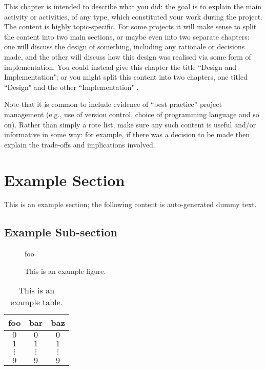 \documentclass[ %
                    author={Carlos Duran Calle},
                supervisor={Dr. Felipe Campelo},
                    degree={MSc},
                     title={Comparative Machine Learning Analysis for Student Dropout Prediction in a Virtual Learning Environment},
                  subtitle={Incorporating Student Engagement and Socio-Economic Features},
                      type={},
                      year={2025}]{dissertation}
\begin{document}
\noindent
This chapter is intended to describe what you did: the goal is to explain
the main activity or activities, of any type, which constituted your work 
during the project.  The content is highly topic-specific. For some 
projects it will make sense to split the content into two main sections, or maybe even into two separate chapters: one 
will discuss the design of something, including any rationale or decisions made, 
and the other will discuss how this design was realised via some form of 
implementation.  You could instead give this chapter the title ``Design and Implementation"; or you might split this content into two chapters, one titled ``Design" and the other ``Implementation" .

Note that it is common to include evidence of ``best practice'' project 
management (e.g., use of version control, choice of programming language 
and so on).  Rather than simply a rote list, make sure any such content 
is useful and/or informative in some way: for example, if there was a 
decision to be made then explain the trade-offs and implications 
involved.

\section{Example Section}

This is an example section; 
the following content is auto-generated dummy text.
\lipsum

\subsection{Example Sub-section}

\begin{figure}[t]
\centering
foo
\caption{This is an example figure.}
\label{fig}
\end{figure}

\begin{table}[t]
\centering
\begin{tabular}{|cc|c|}
\hline
foo      & bar      & baz      \\
\hline
$0     $ & $0     $ & $0     $ \\
$1     $ & $1     $ & $1     $ \\
$\vdots$ & $\vdots$ & $\vdots$ \\
$9     $ & $9     $ & $9     $ \\
\hline
\end{tabular}
\caption{This is an example table.}
\label{tab}
\end{table}
\end{document}
